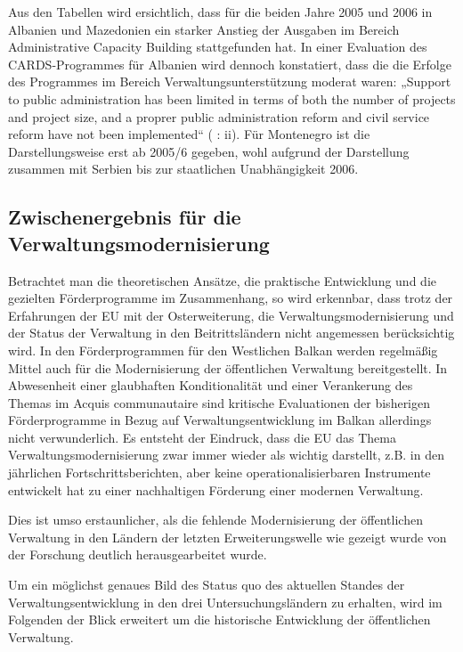 Aus den Tabellen wird ersichtlich, dass für die beiden Jahre 2005 und 2006 in Albanien und Mazedonien ein starker Anstieg der Ausgaben im Bereich Administrative Capacity Building stattgefunden hat. In einer Evaluation des CARDS-Programmes für Albanien wird dennoch konstatiert, dass die die Erfolge des Programmes im Bereich Verwaltungsunterstützung moderat waren: „Support to public administration has been limited in terms of both the number of projects and project size, and a proprer public administration reform and civil service reform have not been implemented“ (\cite{cowi} : ii). Für Montenegro ist die Darstellungsweise erst ab 2005/6 gegeben, wohl aufgrund der Darstellung zusammen mit Serbien bis zur staatlichen Unabhängigkeit 2006. 

\subsection{Zwischenergebnis für die Verwaltungsmodernisierung}
Betrachtet man die theoretischen Ansätze, die praktische Entwicklung und die gezielten Förderprogramme im Zusammenhang, so wird erkennbar, dass trotz der Erfahrungen der EU mit der Osterweiterung, die Verwaltungsmodernisierung und der Status der Verwaltung in den Beitrittsländern nicht angemessen berücksichtig wird. In den Förderprogrammen für den Westlichen Balkan werden regelmäßig Mittel auch für die Modernisierung der öffentlichen Verwaltung bereitgestellt. In Abwesenheit einer glaubhaften Konditionalität und einer Verankerung des Themas im Acquis communautaire sind kritische Evaluationen der bisherigen Förderprogramme in Bezug auf Verwaltungsentwicklung im Balkan allerdings nicht verwunderlich. Es entsteht der Eindruck, dass die EU das Thema Verwaltungsmodernisierung zwar immer wieder als wichtig darstellt, z.B. in den jährlichen Fortschrittsberichten, aber keine operationalisierbaren Instrumente entwickelt hat zu einer nachhaltigen Förderung einer modernen Verwaltung. \par
Dies ist umso erstaunlicher, als die fehlende Modernisierung der öffentlichen Verwaltung in den Ländern der letzten Erweiterungswelle wie gezeigt wurde von der Forschung deutlich herausgearbeitet wurde.\par
Um ein möglichst genaues Bild des Status quo des aktuellen Standes der Verwaltungsentwicklung in den drei Untersuchungsländern zu erhalten, wird im Folgenden der Blick erweitert um die historische Entwicklung der öffentlichen Verwaltung.



